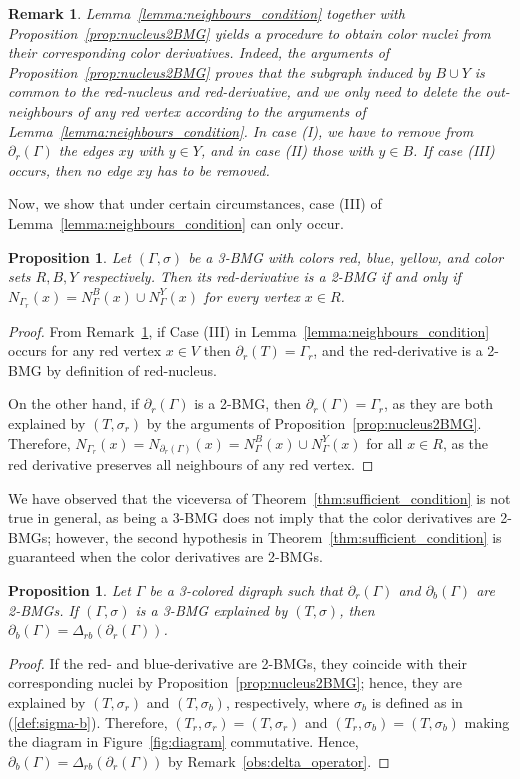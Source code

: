 \documentclass[final,3p,times]{elsarticle}
\newtheorem{proposition}[theorem]{Proposition}%
\newtheorem{remark}[theorem]{Remark}%
\begin{document}
\begin{remark}
\label{rm:derivative2nucleus}
Lemma~\ref{lemma:neighbours_condition} together with Proposition~\ref{prop:nucleus2BMG} yields a procedure to obtain color nuclei from their corresponding color derivatives. Indeed, the arguments of Proposition~\ref{prop:nucleus2BMG} proves that the subgraph induced by $B \cup Y$ is common to the red-nucleus and red-derivative, and we only need to delete the out-neighbours of any red vertex according to the arguments of Lemma~\ref{lemma:neighbours_condition}. In case (I), we have to remove from $\partial_r(\Gamma)$ the edges $xy$ with $y\in Y$, and in case (II) those with $y\in B$. If case (III) occurs, then no edge $xy$ has to be removed. 
\end{remark}
Now, we show that under certain circumstances, case (III) of Lemma~\ref{lemma:neighbours_condition} can only occur. 
\begin{proposition}
\label{prop:ch-2-BMGs-caseiii}
Let $(\Gamma,\sigma)$ be a 3-BMG with colors red, blue, yellow, and color sets $R,B,Y$ respectively. Then its red-derivative is a 2-BMG if and only if $N_{\Gamma_r}(x)=N_{\Gamma}^{B}(x)\cup N_{\Gamma}^{Y}(x)$ for every vertex $x\in R$.
\end{proposition}
\begin{proof}
From Remark~\ref{rm:derivative2nucleus}, if Case (III) in Lemma~\ref{lemma:neighbours_condition} occurs for any red vertex $x\in V$ then $\partial_r(T)=\Gamma_r$, and the red-derivative is a 2-BMG by definition of red-nucleus.

On the other hand, if $\partial_{r}(\Gamma)$ is a 2-BMG, then $\partial_{r}(\Gamma)=\Gamma_{r}$, as they are both explained by $(T,\sigma_r)$ by the arguments of Proposition~\ref{prop:nucleus2BMG}. Therefore, $N_{\Gamma_{r}}(x)= N_{\partial_{r}(\Gamma)}(x)=N_{\Gamma}^{B}(x)\cup N_{\Gamma}^{Y}(x)$ for all $x\in R$, as the red derivative preserves all neighbours of any red vertex.
\end{proof}
We have observed that the viceversa of Theorem~\ref{thm:sufficient_condition} is not true in general, as being a 3-BMG does not imply that the color derivatives are 2-BMGs; however, the second hypothesis in Theorem~\ref{thm:sufficient_condition} is guaranteed when the color derivatives are 2-BMGs. 
\begin{proposition}\label{prop:3BMGs_(D)}
Let $\Gamma$ be a 3-colored digraph such that $\partial_r(\Gamma)$ and $\partial_b(\Gamma)$ are 2-BMGs. If $(\Gamma,\sigma)$ is a 3-BMG explained by $(T,\sigma)$, then $\partial_b(\Gamma)=\Delta_{rb}(\partial_r(\Gamma))$.
\end{proposition}
\begin{proof}
If the red- and blue-derivative are 2-BMGs, they coincide with their corresponding nuclei by Proposition~\ref{prop:nucleus2BMG}; hence, they are explained by $(T,\sigma_r)$ and $(T,\sigma_b)$, respectively, where $\sigma_b$ is defined as in (\ref{def:sigma-b}). Therefore, $(T_r,\sigma_r)=(T,\sigma_r)$ and $(T_r,\sigma_b)=(T,\sigma_b)$ making the diagram in Figure~\ref{fig:diagram} commutative. Hence, $\partial_b(\Gamma)=\Delta_{rb}(\partial_r(\Gamma))$ by Remark~\ref{obs:delta_operator}.
\end{proof}
\end{document}
